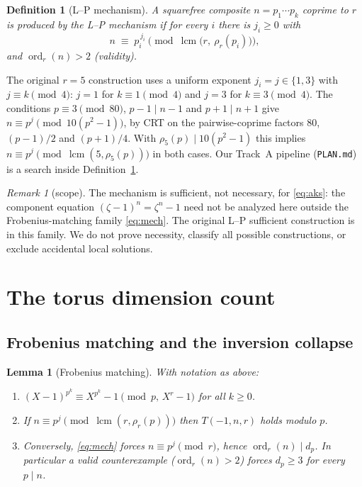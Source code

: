 \documentclass[11pt]{article}
\newtheorem{lemma}[theorem]{Lemma}
\newtheorem{definition}[theorem]{Definition}
\theoremstyle{remark}
\newtheorem{remark}[theorem]{Remark}
\DeclareMathOperator{\lcm}{lcm}
\DeclareMathOperator{\ord}{ord}
\begin{document}
\begin{definition}[L--P mechanism]\label{def:mech}
A squarefree composite $n = p_1 \cdots p_k$ coprime to $r$ is produced by the
\emph{L--P mechanism} if for every $i$ there is $j_i \ge 0$ with
\begin{equation}\label{eq:mech}
n \;\equiv\; p_i^{\,j_i} \pmod{\lcm\bigl(r,\ \rho_r(p_i)\bigr)},
\end{equation}
and $\ord_r(n) > 2$ (validity).
\end{definition}

The original $r=5$ construction \cite{LP,Popovych09} uses a uniform exponent
$j_i=j\in\{1,3\}$ with $j\equiv k\pmod4$: $j=1$ for $k\equiv1\pmod4$
and $j=3$ for $k\equiv3\pmod4$. The conditions $p\equiv3\pmod{80}$,
$p-1\mid n-1$ and $p+1\mid n+1$ give
$n\equiv p^j\pmod{10(p^2-1)}$, by CRT on the pairwise-coprime factors
$80$, $(p-1)/2$ and $(p+1)/4$. With $\rho_5(p)\mid10(p^2-1)$ this implies
$n\equiv p^j\pmod{\lcm(5,\rho_5(p))}$ in both cases. Our Track~A pipeline
(\texttt{PLAN.md}) is a search inside Definition~\ref{def:mech}.

\begin{remark}[scope]\label{rem:scope}
The mechanism is sufficient, not necessary, for \eqref{eq:aks}: the component
equation $(\zeta-1)^n=\zeta^n-1$ need not be analyzed here outside the
Frobenius-matching family \eqref{eq:mech}. The original L--P sufficient
construction is in this family. We do not prove necessity, classify all
possible constructions, or exclude accidental local solutions.
\end{remark}

\section{The torus dimension count}\label{sec:dimcount}

\subsection{Frobenius matching and the inversion collapse}

\begin{lemma}[Frobenius matching]\label{lem:frob}
With notation as above:
\begin{enumerate}
\item[(i)] $(X-1)^{p^k} \equiv X^{p^k} - 1 \pmod{p,\, X^r - 1}$ for all
$k \ge 0$.
\item[(ii)] If $n \equiv p^{j} \pmod{\lcm(r, \rho_r(p))}$ then
$T(-1,n,r)$ holds modulo $p$.
\item[(iii)] Conversely, \eqref{eq:mech} forces $n \equiv p^{j}
\pmod r$, hence $\ord_r(n) \mid d_p$. In particular a valid counterexample
($\ord_r(n) > 2$) forces $d_p \ge 3$ for every $p \mid n$.
\end{enumerate}
\end{lemma}
\end{document}
